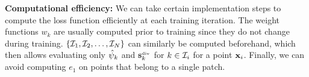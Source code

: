 {\bf Computational efficiency:} We can take certain implementation steps to compute the loss function efficiently at each training iteration. The weight functions $w_k$ are usually computed prior to training since they do not change during training. $\{\mathcal{I}_1, \mathcal{I}_2, \dots, \mathcal{I}_N\}$ can similarly be computed beforehand, which then allows evaluating only $\hat{\psi}_k$ and $\mathbf{s}_{k}^{_{\text{div}}}$ for $k \in \mathcal{I}_i$ for a point $\mathbf{x}_i$. Finally, we can avoid computing $e_1$ on points that belong to a single patch.

%
\pagebreak
